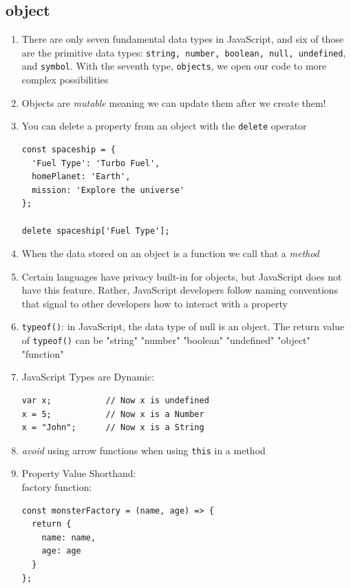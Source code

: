 \documentclass[a4paper, 12pt]{article}
\begin{document}
\subsection{object}
\begin{enumerate}
\item There are only seven fundamental data types in JavaScript, and six of those are the primitive data types: \verb|string, number, boolean, null, undefined|, and \verb|symbol|. With the seventh type, \verb|objects|, we open our code to more complex possibilities

\item Objects are \textit{mutable} meaning we can update them after we create them!

\item You can delete a property from an object with the \verb|delete| operator
\begin{verbatim}
const spaceship = {
  'Fuel Type': 'Turbo Fuel',
  homePlanet: 'Earth',
  mission: 'Explore the universe' 
};

delete spaceship['Fuel Type'];
\end{verbatim}

\item When the data stored on an object is a function we call that a \textit{method}

\item Certain languages have privacy built-in for objects, but JavaScript does not have this feature. Rather, JavaScript developers follow naming conventions that signal to other developers how to interact with a property

\item \verb|typeof()|: in JavaScript, the data type of null is an object. The return value of \verb|typeof()| can be "string" "number" "boolean" "undefined" "object" "function"

\item JavaScript Types are Dynamic:
\begin{verbatim}
var x;           // Now x is undefined
x = 5;           // Now x is a Number
x = "John";      // Now x is a String
\end{verbatim}

\item \textit{avoid} using arrow functions when using \verb|this| in a method

\item Property Value Shorthand:\\
factory function:
\begin{verbatim}
const monsterFactory = (name, age) => {
  return { 
    name: name,
    age: age
  }
};
\end{verbatim}


\end{enumerate}
\end{document}
